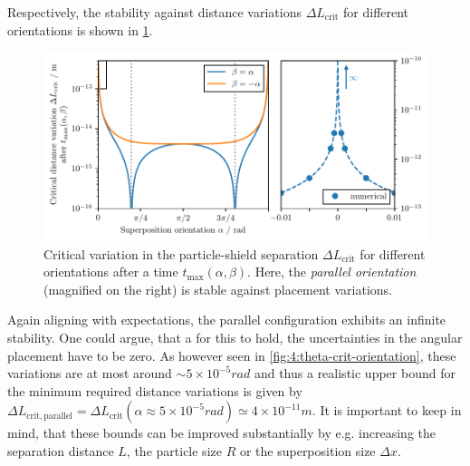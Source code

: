 Respectively, the stability against distance variations $\Delta L_\mathrm{crit}$ for different orientations is shown in \cref{fig:4:L-crit-orientation}.
\begin{figure}[!htbp]
  \centering
  \includegraphics[width=\textwidth]{./../figures/L-variance/L-crit-orientation-complete.pdf}
  \caption{Critical variation in the particle-shield separation $\Delta L_\mathrm{crit}$ for different orientations after a time $t_\mathrm{max}(\alpha,\beta)$. Here, the \emph{parallel orientation} (magnified on the right) is  stable against placement variations.}
  \label{fig:4:L-crit-orientation}
\end{figure}
Again aligning with expectations, the parallel configuration exhibits an infinite stability.
One could argue, that a for this to hold, the uncertainties in the angular placement have to be zero. As however seen in \cref{fig:4:theta-crit-orientation}, these variations are at most around $\sim 5 \times 10^{-5}\si{rad}$ and thus a realistic upper bound for the minimum required distance variations is given by $\Delta L_\mathrm{crit,parallel} = \Delta L_\mathrm{crit}(\alpha \approx 5\times 10^{-5}\si{rad}) \simeq 4\times 10^{-11}\si{m}$.
It is important to keep in mind, that these bounds can be improved substantially by e.g. increasing the separation distance $L$, the particle size $R$ or the superposition size $\Delta x$.

